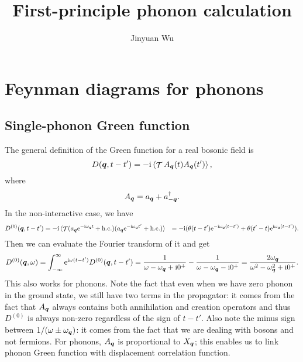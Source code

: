 \documentclass[hyperref, a4paper]{article}
\title{First-principle phonon calculation}
\author{Jinyuan Wu}
\DeclareMathOperator{\timeorder}{\mathcal{T}}
\newcommand*{\ii}{\mathrm{i}}
\newcommand*{\ee}{\mathrm{e}}
\def\\{}%
\begin{document}
\maketitle

\section{Feynman diagrams for phonons}

\subsection{Single-phonon Green function}

The general definition of the Green function for a real bosonic field is 
\begin{equation}
    D(\vb*{q}, t - t') = - \ii \expval*{\timeorder A_{\vb*{q}}(t) A_{\vb*{q}}(t')},
\end{equation}
where 
\begin{equation}
    A_{\vb*{q}} = a_{\vb*{q}} + a^\dagger_{- \vb*{q}}.
\end{equation}
In the non-interactive case, we have
\begin{equation}
    \begin{aligned}
        D^{(0)}(\vb*{q}, t - t') &= - \ii \expval*{\timeorder
            (a_{\vb*{q}} \ee^{- \ii \omega_{\vb*{q}} t} + \text{h.c.})
            (a_{\vb*{q}} \ee^{- \ii \omega_{\vb*{q}} t'} + \text{h.c.})
        } \\
        &= - \ii (\theta(t - t') \ee^{- \ii \omega_{\vb*{q}} (t - t')}
        + \theta(t' - t) \ee^{\ii \omega_{\vb*{q}} (t - t')}).
    \end{aligned}
\end{equation}
Then we can evaluate the Fourier transform of it and get 
\begin{equation}
    D^{(0)}(\vb*{q}, \omega) = \int_{-\infty}^{\infty} \ee^{\ii \omega (t - t')} D^{(0)}(\vb*{q}, t - t')
    = \frac{1}{\omega - \omega_{\vb*{q}} + \ii 0^+} - \frac{1}{\omega - \omega_{\vb*{q}} - \ii 0^+}
    = \frac{2 \omega_{\vb*{q}}}{\omega^2 - \omega_{\vb*{q}}^2 + \ii 0^+}.
\end{equation}
This also works for phonons.
Note the fact that even when we have zero phonon in the ground state, 
we still have two terms in the propagator:
it comes from the fact that $A_{\vb*{q}}$ always contains 
both annihilation and creation operators 
and thus $D^{(0)}$ is always non-zero regardless of the sign of $t - t'$.
Also note the minus sign between $1 / (\omega \pm \omega_{\vb*{q}})$: 
it comes from the fact that we are dealing with bosons and not fermions.
For phonons, $A_{\vb*{q}}$ is proportional to $X_{\vb*{q}}$;
this enables us to link phonon Green function with displacement correlation function.
\end{document}
